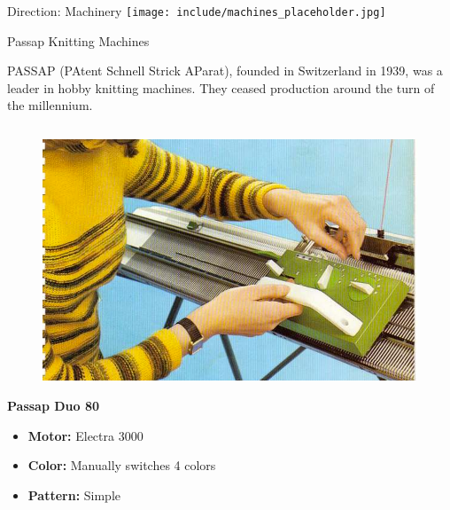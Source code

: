 \documentclass[
    NAME={Dr. Helga Ingimundardóttir},
    EMAIL={helgaingim@hi.is},
    FACULTY={Industrial Engineering},
    TITLE={HiDef Textiles: Reviving Tradition with Innovation},
    SUBTITLE={Empowering Creativity and Sustainability in Textile Production through Digital Transformation},
    SEMINAR={Reykjavík DataBeers},
    DATE={January 25, 2025},
    WIDE={true}
]{HI-LaTeX/hi-beamer}
\begin{document}
\begin{frame}{Direction: Machinery}
\centering
\texttt{[image: include/machines\_placeholder.jpg]}
\end{frame}

\begin{frame}{Passap Knitting Machines}

        PASSAP (PAtent Schnell Strick AParat), founded in Switzerland in 1939, was a leader in hobby knitting machines. They ceased production around the turn of the millennium.

        \begin{columns}

            \begin{column}{0.45\textwidth}
                \begin{figure}
                    \includegraphics[height=0.3\textheight]{include/duo80.png}
                \end{figure}
                \textbf{Passap Duo 80}
                \begin{itemize}
                    \item \textbf{Motor:} Electra 3000
                    \item \textbf{Color:} Manually switches 4 colors
                    \item \textbf{Pattern:} Simple
                \end{itemize}
            \end{column}


\end{columns}
\end{frame}
\end{document}
